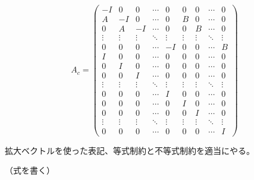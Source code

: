 \begin{equation}
  A_{c} =
  \left(
  \begin{array}{ccccc|cccc}
      -I & 0 & 0 & \cdots & 0 & 0 & 0 & \cdots & 0 \\ A & -I & 0 & \cdots & 0 & B & 0 & \cdots & 0 \\ 0 & A & -I & \cdots & 0 & 0 & B & \cdots & 0\\ \vdots & \vdots & \vdots & \ddots & \vdots & \vdots & \vdots & \ddots & \vdots \\ 0 & 0 & 0 & \cdots & -I & 0 & 0 & \cdots & B\\ \hline I & 0 & 0 & \cdots & 0 & 0 & 0 & \cdots & 0\\ 0 & I & 0 & \cdots & 0 & 0 & 0 & \cdots & 0\\ 0 & 0 & I & \cdots & 0 & 0 & 0 & \cdots & 0\\ \vdots & \vdots & \vdots & \ddots & \vdots & \vdots & \vdots & \ddots & \vdots \\ 0 & 0 & 0 & \cdots & I & 0 & 0 & \cdots & 0\\ 0 & 0 & 0 & \cdots & 0 & I & 0 & \cdots & 0\\ 0 & 0 & 0 & \cdots & 0 & 0 & I & \cdots & 0\\ \vdots & \vdots & \vdots & \ddots & \vdots & \vdots & \vdots & \ddots & \vdots \\ 0 & 0 & 0 & \cdots & 0 & 0 & 0 & \cdots & I
    \end{array}
  \right)
  \label{eq:mpc_constraint_matrix}
\end{equation}



拡大ベクトルを使った表記、等式制約と不等式制約を適当にやる。

（式を書く）

